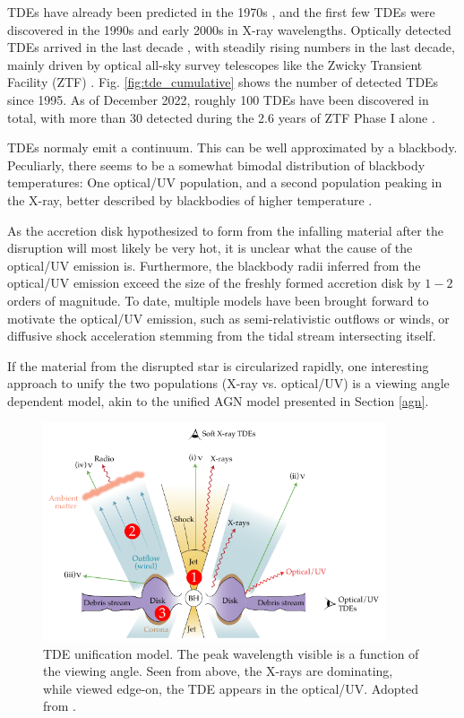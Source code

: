 \documentclass[
    a4paper, %
    fontsize=10pt, %
    twoside=false, %
    numbers=noenddot, %
    fontmethod=tex,
]{kaobook}
\begin{document}
TDEs have already been predicted in the 1970s , and the first few TDEs were discovered in the 1990s and early 2000s in X-ray wavelengths. Optically detected TDEs arrived in the last decade , with steadily rising numbers in the last decade, mainly driven by optical all-sky survey telescopes like the Zwicky Transient Facility  (ZTF) . Fig. \ref{fig:tde_cumulative} shows the number of detected TDEs since 1995. As of December 2022, roughly 100 TDEs have been discovered in total, with more than 30 detected
during the 2.6 years of ZTF Phase I alone .

TDEs normaly emit a continuum. This can be well approximated by a blackbody. Peculiarly, there seems to be a somewhat bimodal distribution of blackbody temperatures: One optical/UV population, and a second population peaking in the X-ray, better described by blackbodies of higher temperature \cite{Gezari2021}. 

As the accretion disk hypothesized to form from the infalling material after the disruption will most likely be very hot, it is unclear what the cause of the optical/UV emission is. Furthermore, the blackbody radii inferred from the optical/UV emission exceed the size of the freshly formed accretion disk by $1-2$ orders of magnitude. To date, multiple models have been brought forward to motivate the optical/UV emission, such as semi-relativistic outflows or winds, or diffusive shock acceleration stemming from the tidal stream intersecting itself. 

If the material from the disrupted star is circularized rapidly, one interesting approach to unify the two populations (X-ray vs. optical/UV) is a viewing angle dependent model, akin to the unified AGN model presented in Section \ref{agn}.

\begin{figure}[htb]
    \includegraphics[width=0.9\textwidth]{theory/tde_unification.pdf}
    \caption[TDE Unification]{TDE unification model. The peak wavelength visible is a function of the viewing angle. Seen from above, the X-rays are dominating, while viewed edge-on, the TDE appears in the optical/UV. Adopted from \cite{Hayasaki2021}.}
\end{figure}
\end{document}
